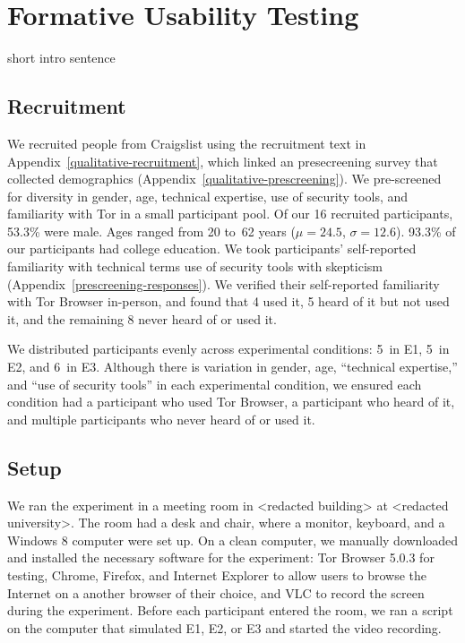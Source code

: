 \documentclass[USenglish,oneside,twocolumn]{article}
\begin{document}
\section{Formative Usability Testing}
\label{sec:qualitative}

{\color {blue}
short intro sentence
}
\subsection{Recruitment}
We recruited people from Craigslist using the recruitment text in Appendix~\ref{qualitative-recruitment}, which linked an presecreening survey that collected demographics (Appendix~\ref{qualitative-prescreening}). We pre-screened~\cite{screening} for diversity in gender, age, technical expertise, use of security tools, and familiarity with Tor in a small participant pool. Of our 16 recruited participants, 53.3\% were male. Ages ranged from 20 to~62 years ($\mu = 24.5$, $\sigma = 12.6$). 93.3\% of our participants had college education. We took participants' self-reported familiarity with technical terms use of security tools with skepticism (Appendix~\ref{prescreening-responses}). We verified their self-reported familiarity with Tor Browser in-person, and found that 4 used it, 5 heard of it but not used it, and the remaining 8 never heard of or used it.  

We distributed participants evenly across experimental conditions:  5~in E1, 5~in E2, and 6~in E3. Although there is variation in gender, age, ``technical expertise,'' and ``use of security tools'' in each experimental condition, we ensured each condition had a participant who used Tor Browser, a participant who heard of it, and multiple participants who never heard of or used it. 

\subsection{Setup} 
We ran the experiment in a meeting room in <redacted building> at <redacted university>. The room had a desk and chair, where a monitor, keyboard, and a Windows 8 computer were set up. On a clean computer, we manually downloaded and installed the necessary software for the experiment: Tor Browser 5.0.3 for testing, Chrome, Firefox, and Internet Explorer to allow users to browse the Internet on a another browser of their choice, and VLC to record the screen during the experiment. Before each participant entered the room, we ran a script on the computer that simulated E1, E2, or E3 and started the video recording.  
\end{document}
